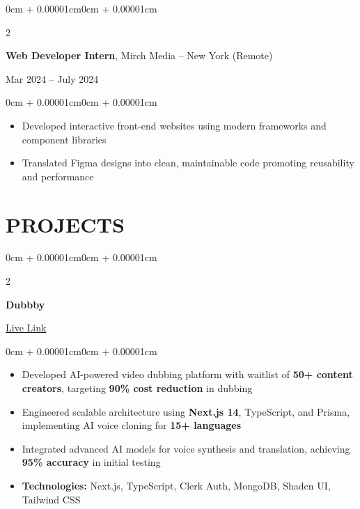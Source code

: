 \documentclass[10pt, letterpaper]{article}
\newenvironment{highlights}{
    \begin{itemize}[
        topsep=0.04cm,
        parsep=0.04cm,
        partopsep=0pt,
        itemsep=0.01cm,
        leftmargin=0.2cm + 9pt
    ]
}{
    \end{itemize}
}
\newenvironment{onecolentry}{
    \begin{adjustwidth}{0cm + 0.00001cm}{0cm + 0.00001cm}
}{
    \end{adjustwidth}
}
\newenvironment{twocolentry}[2][]{
    \onecolentry
    \def\secondColumn{#2}
    \setcolumnwidth{\fill, 4.2cm}
    \begin{paracol}{2}
}{
    \switchcolumn \raggedleft \secondColumn
    \end{paracol}
    \endonecolentry
}
\begin{document}
        \vspace{0.08cm}
        \begin{twocolentry}{
            Mar 2024 – July 2024
        }
            \textbf{Web Developer Intern}, \textcolor{primaryColor}{Mirch Media} -- New York (Remote)
        \end{twocolentry}
        \vspace{0.02cm}
        \begin{onecolentry}
            \begin{highlights}
                \item Developed interactive front-end websites using modern frameworks and component libraries
                \item Translated Figma designs into clean, maintainable code promoting reusability and performance
            \end{highlights}
        \end{onecolentry}

    \section{PROJECTS}
        \begin{twocolentry}{
            \textcolor{primaryColor}{\href{https://dubbby.com}{Live Link}}
        }
            \textbf{Dubbby}
        \end{twocolentry}
        \vspace{0.02cm}
        \begin{onecolentry}
            \begin{highlights}
                \item Developed AI-powered video dubbing platform with waitlist of \textbf{50+ content creators}, targeting \textbf{90\% cost reduction} in dubbing
                \item Engineered scalable architecture using \textbf{Next.js 14}, TypeScript, and Prisma, implementing AI voice cloning for \textbf{15+ languages}
                \item Integrated advanced AI models for voice synthesis and translation, achieving \textbf{95\% accuracy} in initial testing
                \item \textbf{Technologies:} Next.js, TypeScript, Clerk Auth, MongoDB, Shadcn UI, Tailwind CSS
            \end{highlights}
        \end{onecolentry}
\end{document}
